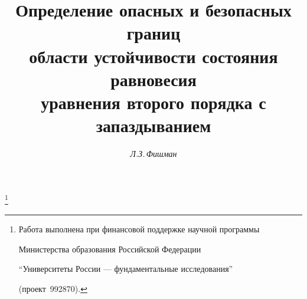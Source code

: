 

 


% 


 


\newcommand{\tg}{\operatorname{tg}} 


\newcommand{\re}{\operatorname{Re}} 


\newcommand{\im}{\operatorname{Im}} 


\newcommand{\tts}[1]{} 


 




\setcounter{page}{61} 












 


\author{\it Л.З.\,Фишман} 




\title{Определение опасных и безопасных границ \\ 


области устойчивости состояния равновесия \\ 


уравнения второго порядка с запаздыванием} 


\thanks{Работа выполнена при финансовой поддержке научной программы 


Министерства образования Российской Федерации


``Университеты России --- фундаментальные исследования''  


(проект \No\,992870).} 


 



